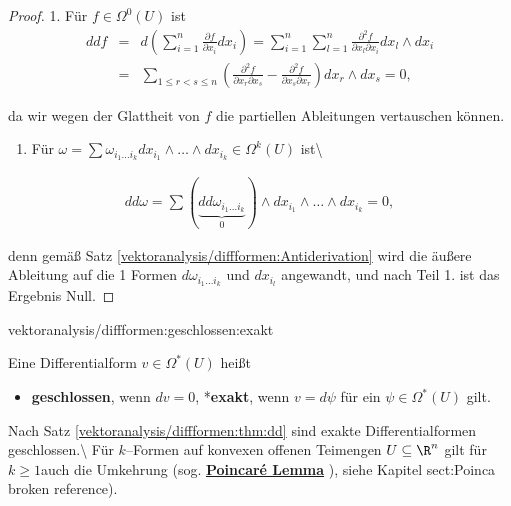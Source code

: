 \documentclass[letterpaper,10pt,english]{jupyterBook}
\begin{document}
\begin{proof}
 1. Für \(f\in\Omega^0(U)\) ist
\begin{align*}
ddf &=& d\left(\sum_{i=1}^n\frac{\partial f}
{\partial x_i}dx_i\right) = \sum_{i=1}^n\sum_{l=1}^n\frac{\partial^2f}{\partial x_l\partial x_i}
dx_l\wedge dx_i\\
& =& \sum_{1\leq r< s\leq n}\left(\frac{\partial^2 f}{\partial x_r
\partial x_s} - \frac{\partial^2f}{\partial x_s\partial x_r}\right)dx_r\wedge dx_s = 0,
\end{align*}
\par
da wir wegen der Glattheit von \(f\) die partiellen Ableitungen vertauschen
können.
\begin{enumerate}

\item {} 
\par
Für \(\omega = \sum\omega_{i_1\ldots i_k}dx_{i_1}\wedge\ldots\wedge dx_{i_k}
\in\Omega^k(U)\) ist\textbackslash{}

\end{enumerate}
\begin{align*}
dd\omega = \sum(\underbrace{dd\omega_{i_1\ldots i_k}}_0)
\wedge dx_{i_1}\wedge\ldots\wedge dx_{i_k} = 0,
\end{align*}
\par
denn gemäß Satz \cref{vektoranalysis/diffformen:Antiderivation} wird die äußere Ableitung auf die
1 Formen \(d\omega_{i_1\ldots i_k}\) und \(dx_{i_l}\) angewandt, und nach Teil 1.
ist das Ergebnis Null.
\end{proof}
\begin{definition}{}{vektoranalysis/diffformen:geschlossen:exakt}



\par
Eine Differentialform \(v\in\Omega^*(U)\) heißt
\begin{itemize}
\item {} 
\par
\textbf{geschlossen}, wenn \(dv=0\), *\textbf{exakt}, wenn \(v=d\psi\) für ein \(\psi\in\Omega^*(U)\) gilt.

\end{itemize}

\par
Nach Satz \cref{vektoranalysis/diffformen:thm:dd} sind exakte Differentialformen geschlossen.\textbackslash{} Für \(k\)–Formen auf konvexen offenen Teimengen \(U\subseteq \R^n\) gilt für \(k\ge 1\)auch die Umkehrung (sog.
\href{https://de.wikipedia.org/wiki/Poincar\%c3\%a9-Lemma}{\textbf{Poincaré Lemma}} ),  siehe Kapitel {sect:Poinca broken reference}).
\end{definition}
\end{document}
